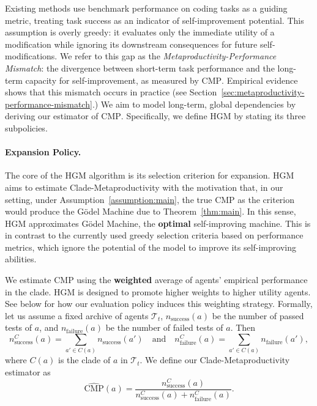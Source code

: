 \documentclass{article} %
\begin{document}
 Existing methods use benchmark performance on coding tasks as a guiding metric, treating task success as an indicator of self-improvement potential. This assumption is overly greedy: it evaluates only the immediate utility of a modification while ignoring its downstream consequences for future self-modifications. We refer to this gap as the \emph{Metaproductivity-Performance Mismatch}: the divergence between short-term task performance and the long-term capacity for self-improvement, as measured by $\mathrm{CMP}$. Empirical evidence shows that this mismatch occurs in practice (see Section~\ref{sec:metaproductivity-performance-mismatch}.) 
We aim to model long-term, global dependencies by deriving our estimator of $\mathrm{CMP}$. Specifically, we define HGM by stating its three subpolicies. 



\paragraph{Expansion Policy.}\label{method:expand-policy}

 The core of the HGM algorithm is its selection criterion for expansion. HGM aims to estimate Clade-Metaproductivity with the motivation that, in our setting, under Assumption~\ref{assumption:main}, the true $\mathrm{CMP}$ as the criterion would produce the G\"odel Machine due to Theorem~\ref{thm:main}. In this sense, HGM approximates G\"odel Machine, the \textbf{optimal} self-improving machine. This is in contrast to the currently used greedy selection criteria based on performance metrics, which ignore the potential of the model to improve its self-improving abilities.

We estimate $\mathrm{CMP}$ using the \textbf{weighted} average of agents' empirical performance in the clade. 
HGM is designed to promote higher weights to higher utility agents. See below for how our evaluation policy induces this weighting strategy.
Formally, let us assume a fixed archive of agents $\mathcal{T}_t$, $n_{\text{success}}(a)$ be the number of passed tests of $a$, and $n_{\text{failure}}(a)$ be the number of failed tests of $a$. Then
\[
n^C_\text{success}(a) = \sum_{a' \in C(a)} n_\text{success}(a') \quad \text{and} \quad n^C_\text{failure}(a) = \sum_{a' \in C(a)} n_\text{failure}(a'),
\]
where $C(a)$ is the clade of $a$ in $\mathcal{T}_t$. We define our Clade-Metaproductivity estimator as
\[{\widehat{\mathrm{CMP}}(a)} =\frac{n^C_\text{success}(a)}{n^C_\text{success}(a)+n^C_\text{failure}(a)}.\]
\end{document}
